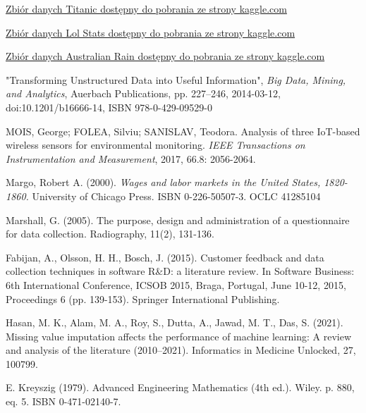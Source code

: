 \documentclass{book}
\begin{document}
\begin{thebibliography}{9}
    
    \href{https://www.kaggle.com/competitions/titanic/data?select=train.csv}{Zbiór danych Titanic dostępny do pobrania ze strony kaggle.com}
    
    \href{https://www.kaggle.com/datasets/vivovinco/league-of-legends-stats-s13}{Zbiór danych Lol Stats dostępny do pobrania ze strony kaggle.com}
    
    \href{https://www.kaggle.com/datasets/jsphyg/weather-dataset-rattle-package}{Zbiór danych Australian Rain dostępny do pobrania ze strony kaggle.com}
    
    "Transforming Unstructured Data into Useful Information", \emph{Big Data, Mining, and Analytics}, Auerbach Publications, pp. 227–246, 2014-03-12, doi:10.1201/b16666-14, ISBN 978-0-429-09529-0

    MOIS, George; FOLEA, Silviu; SANISLAV, Teodora. Analysis of three IoT-based wireless sensors for environmental monitoring. \emph{IEEE Transactions on Instrumentation and Measurement}, 2017, 66.8: 2056-2064.
    
    Margo, Robert A. (2000). \emph{Wages and labor markets in the United States, 1820-1860.} University of Chicago Press. ISBN 0-226-50507-3. OCLC 41285104

    Marshall, G. (2005). The purpose, design and administration of a questionnaire for data collection. Radiography, 11(2), 131-136.

    Fabijan, A., Olsson, H. H., Bosch, J. (2015). Customer feedback and data collection techniques in software R\&D: a literature review. In Software Business: 6th International Conference, ICSOB 2015, Braga, Portugal, June 10-12, 2015, Proceedings 6 (pp. 139-153). Springer International Publishing.

    Hasan, M. K., Alam, M. A., Roy, S., Dutta, A., Jawad, M. T.,  Das, S. (2021). Missing value imputation affects the performance of machine learning: A review and analysis of the literature (2010–2021). Informatics in Medicine Unlocked, 27, 100799.

    E. Kreyszig (1979). Advanced Engineering Mathematics (4th ed.). Wiley. p. 880, eq. 5. ISBN 0-471-02140-7.


\end{thebibliography}
\end{document}
